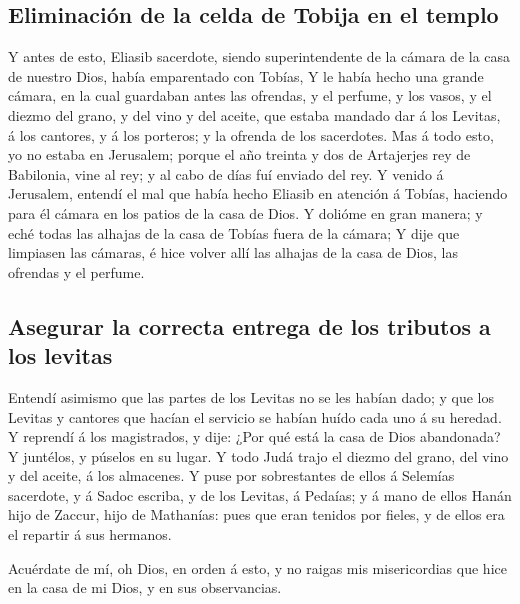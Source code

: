 \hypertarget{eliminaciuxf3n-de-la-celda-de-tobija-en-el-templo}{%
\subsection{Eliminación de la celda de Tobija en el
templo}\label{eliminaciuxf3n-de-la-celda-de-tobija-en-el-templo}}

 Y antes de esto, Eliasib sacerdote, siendo
superintendente de la cámara de la casa de nuestro Dios, había
emparentado con Tobías,  Y le había hecho una grande
cámara, en la cual guardaban antes las ofrendas, y el perfume, y los
vasos, y el diezmo del grano, y del vino y del aceite, que estaba
mandado dar á los Levitas, á los cantores, y á los porteros; y la
ofrenda de los sacerdotes.  Mas á todo esto, yo no estaba
en Jerusalem; porque el año treinta y dos de Artajerjes rey de
Babilonia, vine al rey; y al cabo de días fuí enviado del rey.
 Y venido á Jerusalem, entendí el mal que había hecho
Eliasib en atención á Tobías, haciendo para él cámara en los patios de
la casa de Dios.  Y dolióme en gran manera; y eché todas
las alhajas de la casa de Tobías fuera de la cámara;  Y
dije que limpiasen las cámaras, é hice volver allí las alhajas de la
casa de Dios, las ofrendas y el perfume.

\hypertarget{asegurar-la-correcta-entrega-de-los-tributos-a-los-levitas}{%
\subsection{Asegurar la correcta entrega de los tributos a los
levitas}\label{asegurar-la-correcta-entrega-de-los-tributos-a-los-levitas}}

 Entendí asimismo que las partes de los Levitas no se les
habían dado; y que los Levitas y cantores que hacían el servicio se
habían huído cada uno á su heredad.  Y reprendí á los
magistrados, y dije: ¿Por qué está la casa de Dios abandonada? Y
juntélos, y púselos en su lugar.  Y todo Judá trajo el
diezmo del grano, del vino y del aceite, á los almacenes.
 Y puse por sobrestantes de ellos á Selemías sacerdote, y
á Sadoc escriba, y de los Levitas, á Pedaías; y á mano de ellos Hanán
hijo de Zaccur, hijo de Mathanías: pues que eran tenidos por fieles, y
de ellos era el repartir á sus hermanos.

 Acuérdate de mí, oh Dios, en orden á esto, y no raigas
mis misericordias que hice en la casa de mi Dios, y en sus observancias.


